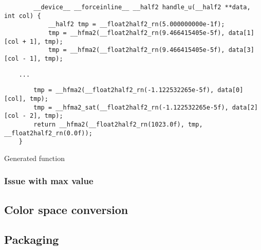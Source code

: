 \begin{listing}[H]
    \begin{verbatim}
        __device__ __forceinline__ __half2 handle_u(__half2 **data, int col) {
            __half2 tmp = __float2half2_rn(5.000000000e-1f);
            tmp = __hfma2(__float2half2_rn(9.466415405e-5f), data[1][col + 1], tmp);
            tmp = __hfma2(__float2half2_rn(9.466415405e-5f), data[3][col - 1], tmp);
        \end{verbatim}
    \vspace{-26pt}
    \begin{verbatim}
    ...
    \end{verbatim}
    \vspace{-26pt}
    \begin{verbatim}
        tmp = __hfma2(__float2half2_rn(-1.122532265e-5f), data[0][col], tmp);
        tmp = __hfma2_sat(__float2half2_rn(-1.122532265e-5f), data[2][col - 2], tmp);
        return __hfma2(__float2half2_rn(1023.0f), tmp, __float2half2_rn(0.0f));
    }
    \end{verbatim}
    \caption{Generated function}
\end{listing}

\subsubsection{Issue with max value}
\subsection{Color space conversion}

\subsection{Packaging}